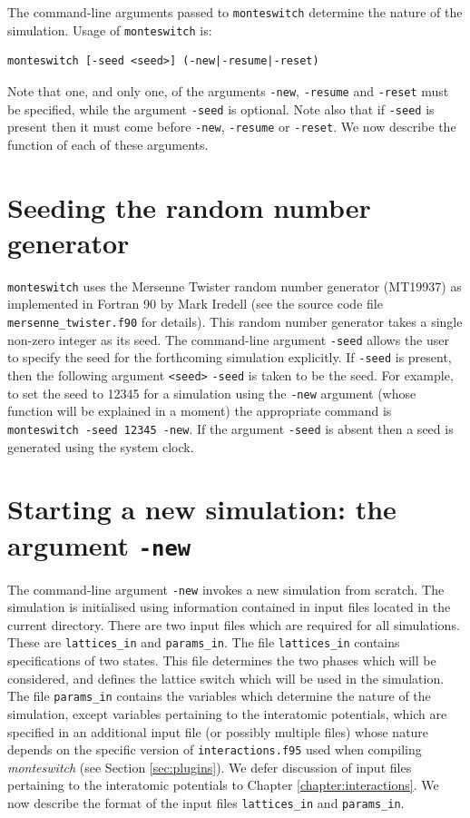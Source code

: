 \documentclass{report}
\begin{document}
The command-line arguments passed to \texttt{monteswitch} determine the nature of the simulation. Usage of \texttt{monteswitch} is: 
\begin{verbatim}
monteswitch [-seed <seed>] (-new|-resume|-reset)
\end{verbatim}
Note that one, and only one, of the arguments \texttt{-new}, \texttt{-resume} and \texttt{-reset} must be specified,
while the argument \texttt{-seed} is optional. Note also that if \texttt{-seed} is present then it must come before \texttt{-new}, 
\texttt{-resume} or \texttt{-reset}. We now describe the function of each of these  arguments.


\section{Seeding the random number generator}
\texttt{monteswitch} uses the Mersenne Twister random number generator (MT19937) \cite{Matsumoto_1998} as implemented in Fortran 90 
by Mark Iredell (see the source code file \texttt{mersenne\_twister.f90} for details). This random number generator takes
a single non-zero integer as its seed. The command-line argument \texttt{-seed} allows the user to specify the 
seed for the forthcoming simulation explicitly. If \texttt{-seed} is present, then the following argument \texttt{<seed>}
\texttt{-seed} is taken to be the seed. For example, to set the seed to 12345 for a simulation using the \texttt{-new}
argument (whose function will be explained in a moment) the appropriate command is \texttt{monteswitch -seed 12345 -new}.
If the argument \texttt{-seed} is absent then a seed is generated using the system clock.


\section{Starting a new simulation: the argument \texttt{-new}}
The command-line argument \texttt{-new} invokes a new simulation from scratch. 
The simulation is initialised using information contained in input files located in the current directory. There are two input files
which are required for all simulations. These are \texttt{lattices\_in} and \texttt{params\_in}. 
The file \texttt{lattices\_in} contains specifications of two states. This file determines the two phases which will be 
considered, and defines the lattice switch which will be used in the simulation. The file \texttt{params\_in} contains the variables
which determine the nature of the simulation, except variables pertaining to the interatomic potentials, which are specified in an additional input
file (or possibly multiple files) whose nature depends on the specific version of \texttt{interactions.f95} used when compiling \emph{monteswitch} 
(see Section \ref{sec:plugins}).
We defer discussion of input files pertaining to the interatomic potentials to Chapter \ref{chapter:interactions}. We now describe
the format of the input files \texttt{lattices\_in} and \texttt{params\_in}.
\end{document}
